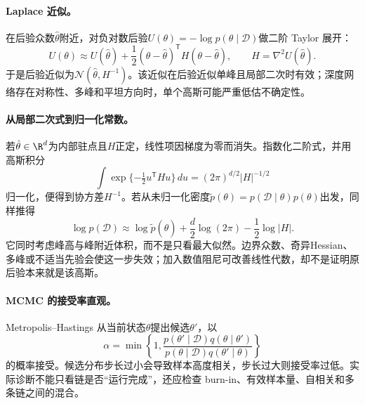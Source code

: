 \paragraph{Laplace 近似。}
在后验众数$\hat\theta$附近，对负对数后验$U(\theta)=-\log p(\theta\mid\mathcal D)$做二阶 Taylor 展开：
\begin{equation}
 U(\theta)\approx U(\hat\theta)+\frac12(\theta-\hat\theta)^{\mathsf T}H(\theta-\hat\theta),
 \qquad H=\nabla^2U(\hat\theta).
\end{equation}
于是后验近似为$\mathcal N(\hat\theta,H^{-1})$。该近似在后验近似单峰且局部二次时有效；深度网络存在对称性、多峰和平坦方向时，单个高斯可能严重低估不确定性。

\paragraph{从局部二次式到归一化常数。}
若$\hat\theta\in\R^d$为内部驻点且$H$正定，线性项因梯度为零而消失。指数化二阶式，并用高斯积分
\begin{equation}
 \int\exp\{-\tfrac12u^{\mathsf T}Hu\}\,du=(2\pi)^{d/2}|H|^{-1/2}
\end{equation}
归一化，便得到协方差$H^{-1}$。若从未归一化密度$\tilde p(\theta)=p(\mathcal D\mid\theta)p(\theta)$出发，同样推得
\begin{equation}
 \log p(\mathcal D)\approx\log\tilde p(\hat\theta)
 +\frac d2\log(2\pi)-\frac12\log|H|.
\end{equation}
它同时考虑峰高与峰附近体积，而不是只看最大似然。边界众数、奇异Hessian、多峰或不适当先验会使这一步失效；加入数值阻尼可改善线性代数，却不是证明原后验本来就是该高斯。

\paragraph{MCMC 的接受率直观。}
Metropolis--Hastings 从当前状态$\theta$提出候选$\theta'$，以
\begin{equation}
 \alpha=\min\left\{1,\frac{p(\theta'\mid\mathcal D)q(\theta\mid\theta')}{p(\theta\mid\mathcal D)q(\theta'\mid\theta)}\right\}
\end{equation}
的概率接受。候选分布步长过小会导致样本高度相关，步长过大则接受率过低。实际诊断不能只看链是否“运行完成”，还应检查 burn-in、有效样本量、自相关和多条链之间的混合。

